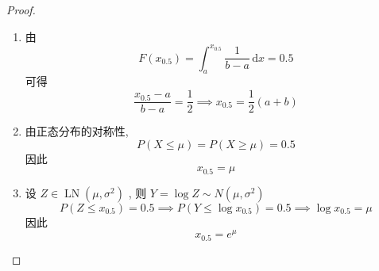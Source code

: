 \documentclass[../main.tex]{subfiles}
\begin{document}
\begin{proof}
     \begin{enumerate}
        \item  由\[
        F\left( x_{0.5} \right)= \int_{a}^{x_{0.5}}\frac{1 }{b-a }\,\mathrm{d} x= 0.5  
        \]可得 \[
        \frac{x_{0.5}-a }{b-a }= \frac{1 }{2 }\implies x_{0.5}= \frac{1 }{2 }\left( a+ b \right)    
        \]
        \item 由正态分布的对称性,  \[
        P\left( X\le \mu  \right)= P\left( X\ge \mu  \right)= 0.5  
        \]因此 \[
        x_{0.5}= \mu 
        \]
        \item 设 \(  Z \in \operatorname{LN}\left( \mu , \sigma ^{2} \right)   \) , 则 \(  Y= \log Z\sim N\left( \mu , \sigma ^{2} \right)   \)  \[
        P\left( Z\le x_{0.5} \right)= 0.5\implies P\left( Y\le \log x_{0.5} \right)= 0.5\implies \log x_{0.5}= \mu   
        \]因此 \[
        x_{0.5}= e^{\mu }
        \]
     \end{enumerate}
     
\end{proof}
 
\end{document}
